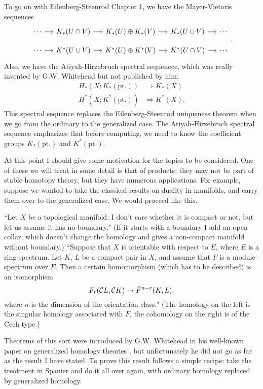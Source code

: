 \documentclass[../main]{subfiles}
\begin{document}
To go on with Eilenberg-Steenrod Chapter 1, we have the Mayer-Vietoris sequences
\[ 
    \begin{tikzcd}[column sep=small, row sep=small]
        \cdots \arrow[r] & K_*(U \cap V) \arrow[r] & K_*(U) \oplus K_*(V) \arrow[r] & K_*(U \cup V) \arrow[r] & \cdots\\
        \cdots \arrow[r] & K^*(U \cup V) \arrow[r] & K^*(U) \oplus K^*(V) \arrow[r] & K^*(U \cap V) \arrow[r] & \cdots
    \end{tikzcd}.
\] 
Also, we have the Atiyah-Hirzebruch spectral sequencce, which was really invented by G.W. Whitehead but not published by him:
\begin{align*}
    H_*(X; K_*(\mathrm{pt.})) &\Longrightarrow K_*(X) \\
    H^*(X; K^*(\mathrm{pt.})) &\Longrightarrow K^*(X).
\end{align*}
This spectral sequence replaces the Eilenberg-Steenrod uniqueness theorem when we go from the ordinary to the generalized case. The Atiyah-Hirzebruch spectral sequence emphasizes that before computing, we need to know the coefficient groups $K_*(\mathrm{pt.})$ and $K^*(\mathrm{pt.})$.

At this point I should give some motivation for the topics to be considered. One of these we will treat in some detail is that of products; they may not be part of stable homotopy theory, but they have numerous applications. For example, suppose we wanted to take the classical results on duality in manifolds, and carry them over to the generalized case. We would proceed like this.

``Let $X$ be a topological manifold; I don't care whether it is compact or not, but let us assume it has no boundary." (If it starts with a boundary I add an open collar, which doesn't change the homology and gives a non-compact manifold without boundary.) ``Suppose that $X$ is orientable with respect to $E$, where $E$ is a ring-spectrum. Let $K$, $L$ be a compact pair in $X$, and assume that $F$ is a module-spectrum over $E$. Then a certain homomorphism (which has to be described) is an isomorphism
\[ F_r(\mathcal C L, \mathcal C K) \to \Breve{F}^{n - r}(K, L), \]
where $n$ is the dimension of the orientation class." (The homology on the left is the singular homology associated with $F$, the cohomology on the right is of the \u Cech type.)

Theorems of this sort were introduced by G.W. Whitehead in his well-known paper on generalized homology theories \plscite{[17}, but unfortunately he did not go as far as the result I have stated. To prove this result follows a simple recipe: take the treatment in Spanier and do it all over again, with ordinary homology replaced by generalized homology.
\end{document}
